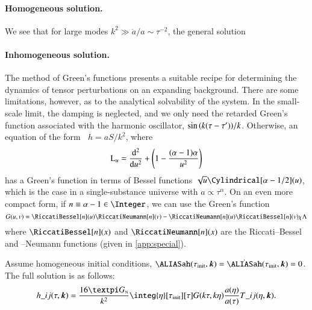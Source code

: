     \paragraph{Homogeneous solution.} %
    We see that for large modes $k^2 \gg \ddot{a}/a \sim \tau^{-2}$, the general solution


    \paragraph{Inhomogeneous solution.} %
    The method of Green's functions presents a suitable recipe for determining the dynamics of tensor perturbations on an expanding background. There are some limitations, however, as to the analytical solvability of the system. In the small-scale limit, the damping is neglected, and we only need the retarded Green's function associated with the harmonic oscillator, $\sin{{\left( k(\tau-\tau') \right)}}/k$. Otherwise, an equation of the form $\mathop{\mathrm{L}_{u=k\tau}}h=aS/k^2$, where
    \begin{equation}
        \mathop{\mathrm{L}_{u}} = \dv[2]{}{u} + {\left( 1 - \frac{(\alpha-1)\alpha}{u^2} \right)}
    \end{equation}
    has a Green's function in terms of Bessel functions $\sqrt{u}\Cylindrical[\alpha-1/2](u)$, which is the case in a single-substance universe with $a \propto \tau^\alpha$. On an even more compact form, if $n\equiv\alpha-1 \in \Integer$, we can use the Green's function
    \begin{equation}\label{eq:GR:lingrav:Greens_function_n}
        G(u,v) = \RiccatiBessel[n](u)\RiccatiNeumann[n](v) - \RiccatiNeumann[n](u)\RiccatiBessel[n](v) \mathsf{\chi} \Lambda
    \end{equation}
    where $\RiccatiBessel[n](x)$ and $\RiccatiNeumann[n](x)$ are the Riccati--Bessel and --Neumann functions (given in \cref{app:special}).
        
        
    Assume homogeneous initial conditions, $\ah(\tau\ped{init}, \vec{k})= \dot{\ah}(\tau\ped{init}, \vec{k})=0$. 
    The full solution is as follows:
    \begin{equation}\label{eq:GR:lingrav:hij_expression_of_Greens_and_source}
        h\_{ij}(\tau, \vec{k}) = \frac{16\ppi G\nped{N}}{k^2} \integ{\eta}[\tau\ped{init}][\tau] G(k\tau, k\eta) \frac{a(\eta)}{a(\tau)} T\_{ij}(\eta, \vec{k}).
    \end{equation}







